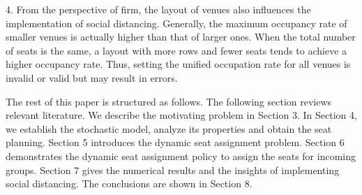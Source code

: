 4. From the perspective of firm, the layout of venues also influences the implementation of social distancing. Generally, the maximum occupancy rate of smaller venues is actually higher than that of larger ones. When the total number of seats is the same, a layout with more rows and fewer seats tends to achieve a higher occupancy rate. Thus, setting the unified occupation rate for all venues is invalid or valid but may result in errors.







The rest of this paper is structured as follows. The following section reviews relevant literature. We describe the motivating problem in Section 3. In Section 4, we establish the stochastic model, analyze its properties and obtain the seat planning. Section 5 introduces the dynamic seat assignment problem.
Section 6 demonstrates the dynamic seat assignment policy to assign the seats for incoming groups. Section 7 gives the numerical results and the insights of implementing social distancing. The conclusions are shown in Section 8.
\newpage
